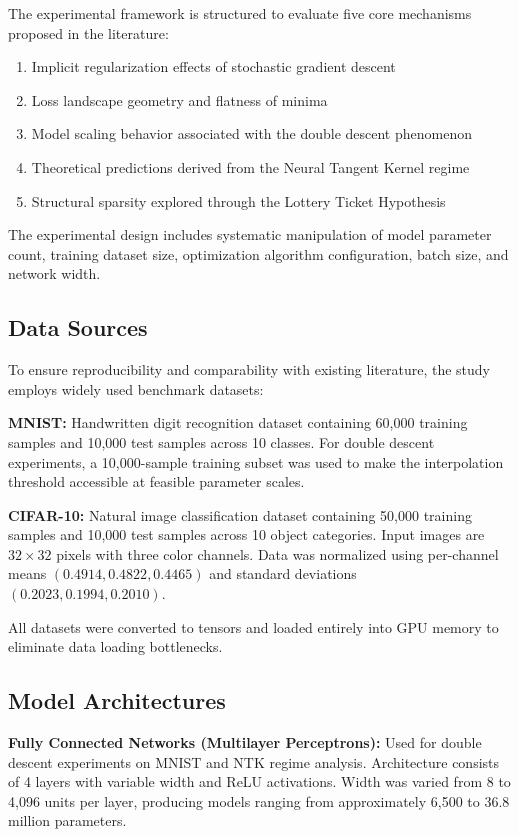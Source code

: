 \documentclass[conference]{IEEEtran}
\begin{document}
The experimental framework is structured to evaluate five core mechanisms proposed in the literature:
\begin{enumerate}
    \item Implicit regularization effects of stochastic gradient descent
    \item Loss landscape geometry and flatness of minima
    \item Model scaling behavior associated with the double descent phenomenon
    \item Theoretical predictions derived from the Neural Tangent Kernel regime
    \item Structural sparsity explored through the Lottery Ticket Hypothesis
\end{enumerate}
The experimental design includes systematic manipulation of model parameter count, training dataset size, optimization algorithm configuration, batch size, and network width.

\subsection{Data Sources}

To ensure reproducibility and comparability with existing literature, the study employs widely used benchmark datasets:

\textbf{MNIST:} Handwritten digit recognition dataset containing 60,000 training samples and 10,000 test samples across 10 classes. For double descent experiments, a 10,000-sample training subset was used to make the interpolation threshold accessible at feasible parameter scales.

\textbf{CIFAR-10:} Natural image classification dataset containing 50,000 training samples and 10,000 test samples across 10 object categories. Input images are $32 \times 32$ pixels with three color channels. Data was normalized using per-channel means $(0.4914, 0.4822, 0.4465)$ and standard deviations $(0.2023, 0.1994, 0.2010)$.

All datasets were converted to tensors and loaded entirely into GPU memory to eliminate data loading bottlenecks.

\subsection{Model Architectures}

\textbf{Fully Connected Networks (Multilayer Perceptrons):} Used for double descent experiments on MNIST and NTK regime analysis. Architecture consists of 4 layers with variable width and ReLU activations. Width was varied from 8 to 4,096 units per layer, producing models ranging from approximately 6,500 to 36.8 million parameters.
\end{document}
